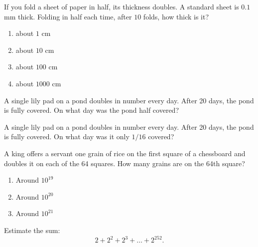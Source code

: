 \documentclass[noauthor]{ximera}
\author{Bart Snapp}
\begin{document}
\maketitle


\begin{exercise}
If you fold a sheet of paper in half, its thickness doubles. A standard sheet is $0.1$ mm thick.
Folding in half each time, after  $10$ folds, how thick is it?
\begin{enumerate}
  \item about $1$ cm
  \item about $10$ cm
  \item about $100$ cm
  \item about $1000$ cm
\end{enumerate}
\end{exercise}

\begin{exercise}
  A single lily pad on a pond doubles in number every day. After 20 days, the pond is fully covered.
  On what day was the pond half covered?
\end{exercise}


\begin{exercise}
  A single lily pad on a pond doubles in number every day. After 20 days, the pond is fully covered.
  On what day was it only $1/16$ covered?
\end{exercise}


\begin{exercise}
  A king offers a servant one grain of rice on the first square of a chessboard and doubles it on each of the 64 squares.
  How many grains are on the 64th square?
  \begin{enumerate}
    \item Around $10^{19}$
    \item Around $10^{20}$ 
    \item Around $10^{21}$ 
  \end{enumerate}
\end{exercise}


\begin{exercise}
Estimate the sum:
\[
2 + 2^2 + 2^3 + \dots + 2^{252}.
\]
\end{exercise}

\end{document}
